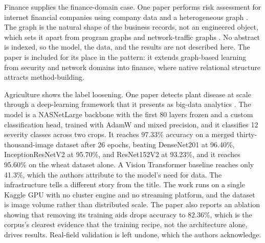 \documentclass[pdflatex,sn-basic,Numbered]{sn-jnl}%
\begin{document}
Finance supplies the finance-domain case. One paper performs risk assessment for internet financial companies using company data and a heterogeneous graph \citep{liu2026heterogeneous}. The graph is the natural shape of the business records, not an engineered object, which sets it apart from program graphs \citep{mohammadian2025explainable} and network-traffic graphs \citep{zhang2025graph}. No abstract is indexed, so the model, the data, and the results are not described here. The paper is included for its place in the pattern: it extends graph-based learning from security and network domains into finance, where native relational structure attracts method-building.

Agriculture shows the label loosening. One paper detects plant disease at scale through a deep-learning framework that it presents as big-data analytics \citep{elfouly2025deep}. The model is a NASNetLarge backbone with the first 80 layers frozen and a custom classification head, trained with AdamW and mixed precision, and it classifies 12 severity classes across two crops. It reaches 97.33\% accuracy on a merged thirty-thousand-image dataset after 26 epochs, beating DenseNet201 at 96.40\%, InceptionResNetV2 at 95.70\%, and ResNet152V2 at 93.23\%, and it reaches 95.60\% on the wheat dataset alone. A Vision Transformer baseline reaches only 41.3\%, which the authors attribute to the model's need for data. The infrastructure tells a different story from the title. The work runs on a single Kaggle GPU with no cluster engine and no streaming platform, and the dataset is image volume rather than distributed scale. The paper also reports an ablation showing that removing its training aids drops accuracy to 82.36\%, which is the corpus's clearest evidence that the training recipe, not the architecture alone, drives results. Real-field validation is left undone, which the authors acknowledge.
\end{document}
